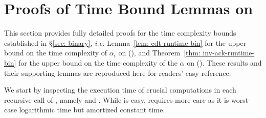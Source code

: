 \section{Proofs of Time Bound Lemmas on }
\label{apx:time_analysis_bin}

\renewcommand{\Tleb}{\runtime_{\li{N.leb}}}
\renewcommand{\Tsucc}{\runtime_{\li{N.succ}}}

This section provides fully detailed proofs for the time complexity bounds established in \S\ref{sec: binary},
\emph{i.e.} Lemma~\ref{lem: cdt-runtime-bin} for the upper bound on the time complexity of $\alpha_i$ on  (),
and Theorem~\ref{thm: inv-ack-runtime-bin} for the upper bound on the time complexity of the $\alpha$ on  ().
These results and their supporting lemmas are reproduced here for readers' easy reference.

We start by inspecting the execution time of crucial computations in each recursive call of , namely  and . While  is easy,  requires more care as it is worst-case logarithmic time but amortized constant time.

